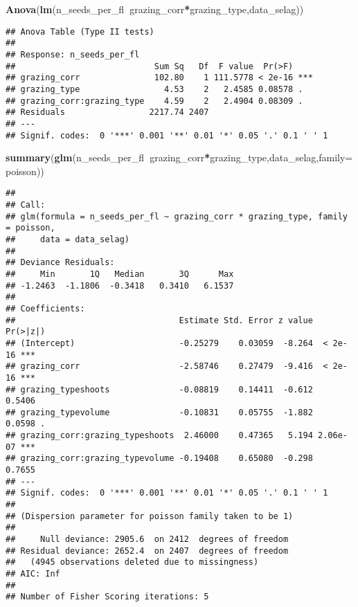 \documentclass[
]{article}
\newenvironment{Shaded}{\begin{snugshade}}{\end{snugshade}}
\newcommand{\DataTypeTok}[1]{\textcolor[rgb]{0.13,0.29,0.53}{#1}}
\newcommand{\KeywordTok}[1]{\textcolor[rgb]{0.13,0.29,0.53}{\textbf{#1}}}
\newcommand{\NormalTok}[1]{#1}
\newcommand{\OperatorTok}[1]{\textcolor[rgb]{0.81,0.36,0.00}{\textbf{#1}}}
\begin{document}
\begin{Shaded}
\begin{Highlighting}[]
\KeywordTok{Anova}\NormalTok{(}\KeywordTok{lm}\NormalTok{(n_seeds_per_fl}\OperatorTok{~}\NormalTok{grazing_corr}\OperatorTok{*}\NormalTok{grazing_type,data_selag))}
\end{Highlighting}
\end{Shaded}

\begin{verbatim}
## Anova Table (Type II tests)
## 
## Response: n_seeds_per_fl
##                            Sum Sq   Df  F value  Pr(>F)    
## grazing_corr               102.80    1 111.5778 < 2e-16 ***
## grazing_type                 4.53    2   2.4585 0.08578 .  
## grazing_corr:grazing_type    4.59    2   2.4904 0.08309 .  
## Residuals                 2217.74 2407                     
## ---
## Signif. codes:  0 '***' 0.001 '**' 0.01 '*' 0.05 '.' 0.1 ' ' 1
\end{verbatim}

\begin{Shaded}
\begin{Highlighting}[]
\KeywordTok{summary}\NormalTok{(}\KeywordTok{glm}\NormalTok{(n_seeds_per_fl}\OperatorTok{~}\NormalTok{grazing_corr}\OperatorTok{*}\NormalTok{grazing_type,data_selag,}\DataTypeTok{family=}\NormalTok{poisson))}
\end{Highlighting}
\end{Shaded}

\begin{verbatim}
## 
## Call:
## glm(formula = n_seeds_per_fl ~ grazing_corr * grazing_type, family = poisson, 
##     data = data_selag)
## 
## Deviance Residuals: 
##     Min       1Q   Median       3Q      Max  
## -1.2463  -1.1806  -0.3418   0.3410   6.1537  
## 
## Coefficients:
##                                 Estimate Std. Error z value Pr(>|z|)    
## (Intercept)                     -0.25279    0.03059  -8.264  < 2e-16 ***
## grazing_corr                    -2.58746    0.27479  -9.416  < 2e-16 ***
## grazing_typeshoots              -0.08819    0.14411  -0.612   0.5406    
## grazing_typevolume              -0.10831    0.05755  -1.882   0.0598 .  
## grazing_corr:grazing_typeshoots  2.46000    0.47365   5.194 2.06e-07 ***
## grazing_corr:grazing_typevolume -0.19408    0.65080  -0.298   0.7655    
## ---
## Signif. codes:  0 '***' 0.001 '**' 0.01 '*' 0.05 '.' 0.1 ' ' 1
## 
## (Dispersion parameter for poisson family taken to be 1)
## 
##     Null deviance: 2905.6  on 2412  degrees of freedom
## Residual deviance: 2652.4  on 2407  degrees of freedom
##   (4945 observations deleted due to missingness)
## AIC: Inf
## 
## Number of Fisher Scoring iterations: 5
\end{verbatim}
\end{document}
